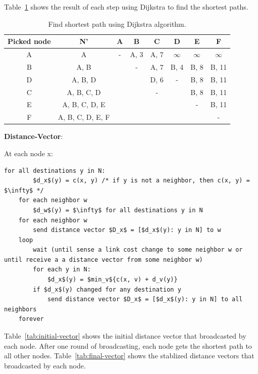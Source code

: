 \documentclass{article}
\begin{document}
Table~\ref{tab:dijkstra} shows the result of each step using Dijkstra to find the shortest paths.
\begin{table}[h!]
    \begin{center}
      \caption{Find shortest path using Dijkstra algorithm.}
      \label{tab:dijkstra}
      \begin{tabular}{c|c|c|c|c|c|c|c} %
        \toprule
        \textbf{Picked node}& \textbf{N'}& \textbf{A}&\textbf{B}&\textbf{C}&\textbf{D}&\textbf{E}&\textbf{F}\\
        \hline
        A&{A}&-&A, 3&A, 7&$\infty$&$\infty$&$\infty$\\
        \hline
        B&{A, B}&&-&A, 7&B, 4&B, 8&B, 11\\
        \hline
        D&{A, B, D}&&&D, 6&-&B, 8&B, 11\\
        \hline
        C&{A, B, C, D}&&&-&&B, 8&B, 11\\
        \hline
        E&{A, B, C, D, E}&&&&&-&B, 11\\
        \hline
        F&{A, B, C, D, E, F}&&&&&&-\\
        \bottomrule
      \end{tabular}
    \end{center}
  \end{table}

\textbf{Distance-Vector}:

At each node x:
\begin{lstlisting}[mathescape=true]
    for all destinations y in N:
        $d_x$(y) = c(x, y) /* if y is not a neighbor, then c(x, y) = $\infty$ */
    for each neighbor w
        $d_w$(y) = $\infty$ for all destinations y in N
    for each neighbor w
        send distance vector $D_x$ = [$d_x$(y): y in N] to w
    loop
        wait (until sense a link cost change to some neighbor w or until receive a a distance vector from some neighbor w)
        for each y in N:
            $d_x$(y) = $min_v${c(x, v) + d_v(y)}
        if $d_x$(y) changed for any destination y
            send distance vector $D_x$ = [$d_x$(y): y in N] to all neighbors
    forever
\end{lstlisting}

Table~\ref{tab:initial-vector} shows the initial distance vector that broadcasted by each node. After one round of broadcasting, each node gets the shortest path to all other nodes. Table~\ref{tab:final-vector} shows the stablized distance vectors that broadcasted by each node.
\end{document}
